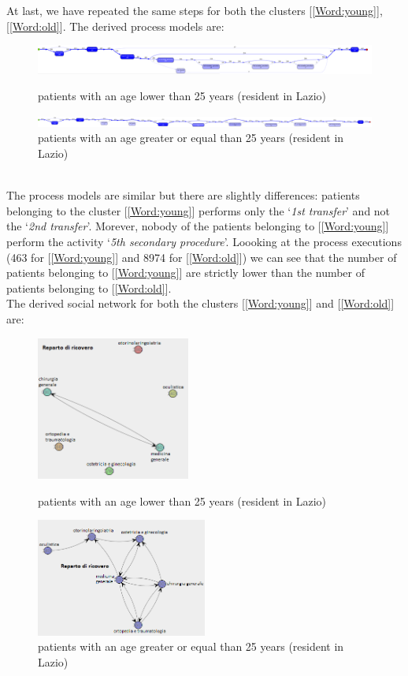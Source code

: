 \clearpage
\noindent
At last, we have repeated the same steps for both the clusters [\ref{Word:young}], [\ref{Word:old}]. The derived process models are:
\begin{figure} [htbp]
\includegraphics[width=\textwidth]{RicoveriInductiveVisualMinerYoungs}
\caption{patients with an age lower than 25 years (resident in Lazio)}
\includegraphics[width=\textwidth]{RicoveriInductiveVisualMinerOlds}
\caption{patients with an age greater or equal than 25 years (resident in Lazio)}
\end{figure}\\
The process models are similar but there are slightly differences: patients belonging to the cluster [\ref{Word:young}] performs only the `\textit{1st transfer}' and not the `\textit{2nd transfer}'. Morever, nobody of the patients belonging to [\ref{Word:young}] perform the activity `\textit{5th secondary procedure}'. Loooking at the process executions (463 for [\ref{Word:young}] and 8974 for [\ref{Word:old}]) we can see that the number of patients belonging to [\ref{Word:young}] are strictly lower than the number of patients belonging to [\ref{Word:old}].\\
The derived social network for both the clusters [\ref{Word:young}] and [\ref{Word:old}] are:
\begin{figure} [htbp]
\includegraphics[width=0.45\textwidth]{RicoveriSocialNetworkYoungs}
\caption{patients with an age lower than 25 years (resident in Lazio)}
\includegraphics[width=0.50\textwidth]{RicoveriSocialNetworkOlds}
\caption{patients with an age greater or equal than 25 years (resident in Lazio)}
\end{figure}\\
